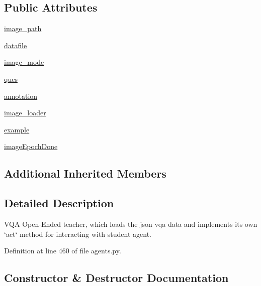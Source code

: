 \subsection*{Public Attributes}
\begin{DoxyCompactItemize}
\item 
\hyperlink{classparlai_1_1tasks_1_1vqa__v1_1_1agents_1_1OeTeacher_a93136db89c9b7943ff6aaeb28157d12e}{image\+\_\+path}
\item 
\hyperlink{classparlai_1_1tasks_1_1vqa__v1_1_1agents_1_1OeTeacher_a12671717135e971a2ec374079432b670}{datafile}
\item 
\hyperlink{classparlai_1_1tasks_1_1vqa__v1_1_1agents_1_1OeTeacher_ae600010b7db2aaf523db54fb0ef28906}{image\+\_\+mode}
\item 
\hyperlink{classparlai_1_1tasks_1_1vqa__v1_1_1agents_1_1OeTeacher_a180c1596f72999be0858a5c9c651c93a}{ques}
\item 
\hyperlink{classparlai_1_1tasks_1_1vqa__v1_1_1agents_1_1OeTeacher_ae7832c20e91858e3bbea62e333d585e5}{annotation}
\item 
\hyperlink{classparlai_1_1tasks_1_1vqa__v1_1_1agents_1_1OeTeacher_a658acd2bdd2d7c4fdd93fd0518423441}{image\+\_\+loader}
\item 
\hyperlink{classparlai_1_1tasks_1_1vqa__v1_1_1agents_1_1OeTeacher_ae9a071fc33afe67bfeae01dbd2857608}{example}
\item 
\hyperlink{classparlai_1_1tasks_1_1vqa__v1_1_1agents_1_1OeTeacher_a5db996acbd73e3fc6f45d69dd61fcefd}{image\+Epoch\+Done}
\end{DoxyCompactItemize}
\subsection*{Additional Inherited Members}


\subsection{Detailed Description}
\begin{DoxyVerb}VQA Open-Ended teacher, which loads the json vqa data and implements its
own `act` method for interacting with student agent.
\end{DoxyVerb}
 

Definition at line 460 of file agents.\+py.



\subsection{Constructor \& Destructor Documentation}
\mbox{\label{classparlai_1_1tasks_1_1vqa__v1_1_1agents_1_1OeTeacher_a508a90334629ef603b9520a98b5200a0}} 
